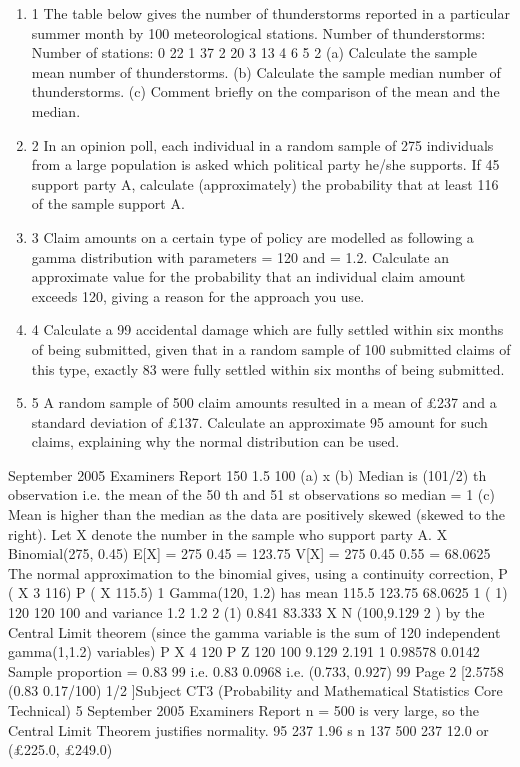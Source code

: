 \documentclass[a4paper,12pt]{article}
\begin{document}

\begin{enumerate}
\item 1
The table below gives the number of thunderstorms reported in a particular summer
month by 100 meteorological stations.
Number of thunderstorms:
Number of stations:
0
22
1
37
2
20
3
13
4
6
5
2
(a) Calculate the sample mean number of thunderstorms.
(b) Calculate the sample median number of thunderstorms.
(c) Comment briefly on the comparison of the mean and the median.
\item 
2 In an opinion poll, each individual in a random sample of 275 individuals from a large
population is asked which political party he/she supports. If 45%
support party A, calculate (approximately) the probability that at least 116 of the
sample support A.
\item 
3 Claim amounts on a certain type of policy are modelled as following a gamma
distribution with parameters = 120 and = 1.2.
Calculate an approximate value for the probability that an individual claim amount
exceeds 120, giving a reason for the approach you use.
\item 
4 Calculate a 99%
accidental damage which are fully settled within six months of being submitted, given
that in a random sample of 100 submitted claims of this type, exactly 83 were fully
settled within six months of being submitted.
\item 
5 A random sample of 500 claim amounts resulted in a mean of £237 and a standard
deviation of £137.
Calculate an approximate 95%
amount for such claims, explaining why the normal distribution can be used.

\end{enumerate}
September 2005
Examiners Report
150
1.5
100
(a) x
(b) Median is (101/2) th observation i.e. the mean of the 50 th and 51 st observations
so median = 1
(c) Mean is higher than the median as the data are positively skewed (skewed to
the right).
Let X denote the number in the sample who support party A.
X ~ Binomial(275, 0.45)
E[X] = 275 0.45 = 123.75
V[X] = 275 0.45 0.55 = 68.0625
The normal approximation to the binomial gives, using a continuity correction,
P ( X
3
116)
P ( X
115.5) 1
Gamma(120, 1.2) has mean
115.5 123.75
68.0625
1
( 1)
120
120
100 and variance
1.2
1.2 2
(1) 0.841
83.333
X N (100,9.129 2 ) by the Central Limit theorem (since the gamma variable is the
sum of 120 independent gamma(1,1.2) variables)
P X
4
120
P Z
120 100
9.129
2.191
1 0.98578 0.0142
Sample proportion = 0.83
99%
i.e. 0.83 0.0968 i.e. (0.733, 0.927)
99%
Page 2
[2.5758
(0.83 0.17/100) 1/2 ]Subject CT3 (Probability and Mathematical Statistics Core Technical)
5
September 2005
Examiners Report
n = 500 is very large, so the Central Limit Theorem justifies normality.
95%
237 1.96
s
n
137
500
237 12.0 or (£225.0, £249.0)
\end{document}
